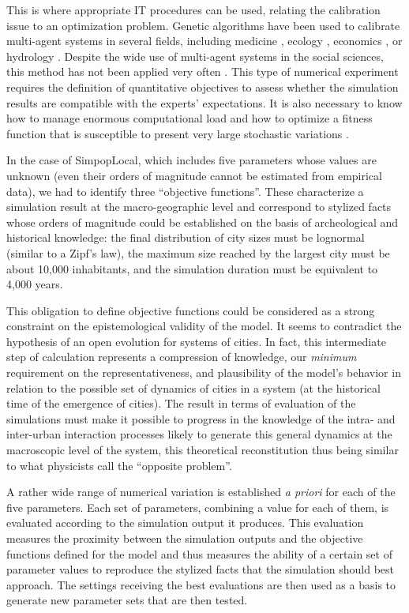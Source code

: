 \documentclass[10pt]{article}
\begin{document}
This is where appropriate IT procedures can be used, relating the calibration issue to an optimization problem. Genetic algorithms have been used to calibrate multi-agent systems in several fields, including medicine \citep{castiglione2007optimization}, ecology \citep{duboz2010application}, economics \citep{espinosa2012genetic,stonedahl2010evolutionary}, or hydrology \citep{solomatine1999automatic}. Despite the wide use of multi-agent systems in the social sciences, this method has not been applied very often \citep{heppenstall2007genetic,stonedahl2010evolutionary}. This type of numerical experiment requires the definition of quantitative objectives to assess whether the simulation results are compatible with the experts’ expectations. It is also necessary to know how to manage enormous computational load and how to optimize a fitness function that is susceptible to present very large stochastic variations \citep{di2004applying}.


In the case of SimpopLocal, which includes five parameters whose values are unknown (even their orders of magnitude cannot be estimated from empirical data), we had to identify three ``objective functions''. These characterize a simulation result at the macro-geographic level and correspond to stylized facts whose orders of magnitude could be established on the basis of archeological and historical knowledge: the final distribution of city sizes must be lognormal (similar to a Zipf’s law), the maximum size reached by the largest city must be about 10,000 inhabitants, and the simulation duration must be equivalent to 4,000 years.


This obligation to define objective functions could be considered as a strong constraint on the epistemological validity of the model. It seems to contradict the hypothesis of an open evolution for systems of cities. In fact, this intermediate step of calculation represents a compression of knowledge, our \emph{minimum} requirement on the representativeness, and plausibility of the model’s behavior in relation to the possible set of dynamics of cities in a system (at the historical time of the emergence of cities). The result in terms of evaluation of the simulations must make it possible to progress in the knowledge of the intra- and inter-urban interaction processes likely to generate this general dynamics at the macroscopic level of the system, this theoretical reconstitution thus being similar to what physicists call the ``opposite problem''.


A rather wide range of numerical variation is established \emph{a priori} for each of the five parameters. Each set of parameters, combining a value for each of them, is evaluated according to the simulation output it produces. This evaluation measures the proximity between the simulation outputs and the objective functions defined for the model and thus measures the ability of a certain set of parameter values to reproduce the stylized facts that the simulation should best approach. The settings receiving the best evaluations are then used as a basis to generate new parameter sets that are then tested.
\end{document}
